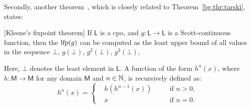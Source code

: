 Secondly, another theorem~\cite{kleene52}, which is closely
related to Theorem~\ref{bg:thr:tarski}, states:
\begin{theorem}
    \textup{[Kleene's fixpoint theorem]}
    If $\mathsf{L}$ is a \gls{cpo}\footnotemark[2], and $g: \mathsf{L} \to
    \mathsf{L}$ is a Scott-continuous function, then the $\operatorname{\mathrm{lfp}} (g)$ can be
    computed as the least upper bound of all values in the sequence $\bot$,
    $g(\bot)$, $g^2(\bot)$, $g^3(\bot)$, \textellipsis{}\label{bg:thr:kleene}
\end{theorem}
Here, $\bot$ denotes the least element in $\mathsf{L}$.  A function of the form
$h^n(x)$, where $h: \mathsf{M} \to \mathsf{M}$ for any domain $\mathsf{M}$ and
$n \in \mathbb{N}$, is recursively defined as:
\begin{equation}
    h^n(x) = \left\{
        \begin{aligned}
            & h(h^{n-1}(x)) \quad && \text{if~} n > 0, \\
            & x && \text{if~} n = 0.
        \end{aligned}
    \right.
\end{equation}

